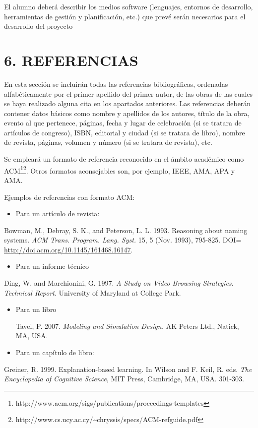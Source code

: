\documentclass[a4paper]{article}
\newcommand\liststyleLi{%
\renewcommand\labelitemi{{\textbullet}}
\renewcommand\labelitemii{${\circ}$}%
\renewcommand\labelitemiii{${\blacksquare}$}
\renewcommand\labelitemiv{{\textbullet}}
}
\newcommand\liststyleLii{%
\renewcommand\labelitemi{{\textbullet}}
\renewcommand\labelitemii{${\circ}$}
\renewcommand\labelitemiii{${\blacksquare}$}
\renewcommand\labelitemiv{{\textbullet}}
}
\newcommand\liststyleLiii{%
\renewcommand\labelitemi{{\textbullet}}
\renewcommand\labelitemii{${\circ}$}
\renewcommand\labelitemiii{${\blacksquare}$}
\renewcommand\labelitemiv{{\textbullet}}
}
\newcommand\liststyleLiv{%
\renewcommand\labelitemi{{\textbullet}}
\renewcommand\labelitemii{${\circ}$}
\renewcommand\labelitemiii{${\blacksquare}$}
\renewcommand\labelitemiv{{\textbullet}}
}
\begin{document}
El alumno deber\'a describir los medios software (lenguajes, entornos de desarrollo, herramientas de gesti\'on y
planificaci\'on, etc.) que prev\'e ser\'an necesarios para el desarrollo del proyecto


\section[6. REFERENCIAS]{6. REFERENCIAS}
En esta secci\'on se incluir\'an todas las referencias bibliogr\'aficas, ordenadas alfab\'eticamente por el primer
apellido del primer autor, de las obras de las cuales se haya realizado alguna cita en los apartados anteriores. Las
referencias deber\'an contener datos b\'asicos como nombre y apellidos de los autores, t\'itulo de la obra, evento al
que pertenece, p\'aginas, fecha y lugar de celebraci\'on (si se tratara de art\'iculos de congreso), ISBN, editorial y
ciudad (si se tratara de libro), nombre de revista, p\'aginas, volumen y n\'umero (si se tratara de revista), etc.

Se emplear\'a un formato de referencia reconocido en el \'ambito acad\'emico como
ACM\footnote{http://www.acm.org/sigs/publications/proceedings-templates}\footnote{http://www.cs.ucy.ac.cy/\~{}chryssis/specs/ACM-refguide.pdf}.
Otros formatos aconsejables son, por ejemplo, IEEE, AMA, APA y AMA.

Ejemplos de referencias con formato ACM:

\liststyleLi
\begin{itemize}
\item Para un art\'iculo de revista:
\end{itemize}
Bowman, M., Debray, S. K., and Peterson, L. L. 1993. Reasoning about naming systems. \textit{ACM Trans. Program. Lang.
Syst.} 15, 5 (Nov. 1993), 795-825. DOI= \url{http://doi.acm.org/10.1145/161468.16147}.

\liststyleLii
\begin{itemize}
\item Para un informe t\'ecnico
\end{itemize}
Ding, W. and Marchionini, G. 1997. \textit{A Study on Video Browsing Strategies. Technical Report}. University of
Maryland at College Park.

\liststyleLiii
\begin{itemize}
\item Para un libro

Tavel, P. 2007. \textit{Modeling and Simulation Design.} AK Peters Ltd., Natick, MA, USA.
\end{itemize}
\liststyleLiv
\begin{itemize}
\item Para un cap\'itulo de libro:
\end{itemize}
Greiner, R. 1999. Explanation-based learning. In Wilson and F. Keil, R. eds. \textit{The Encyclopedia of Cognitive
Science}, MIT Press, Cambridge, MA, USA. 301-303.
\end{document}
